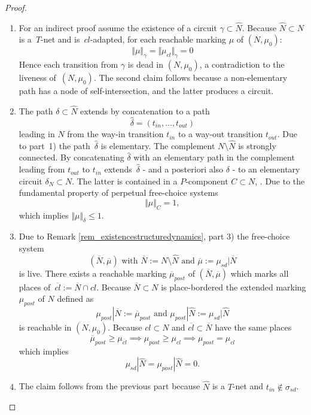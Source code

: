 \documentclass{fundam}
\newcommand{\qed}{}
\begin{document}
\begin{proof}

\vspace*{-6mm}
\begin{enumerate}
\item For an indirect proof assume the existence of a circuit $\gamma \subset \hat{N}$. Because $\hat{N} \subset N$ is \mbox{a $T$-net} and \mbox{is $cl$-adapted}, for each reachable marking $\mu$ of $(N,\mu_0)$:
$$\Vert \mu \Vert_\gamma=\Vert \mu_{cl} \Vert_\gamma=0$$
Hence each transition from $\gamma$ is dead in $(N,\mu_0)$, a contradiction to the liveness \mbox{of $(N,\mu_0)$}. The second claim follows because a non-elementary path has a node of self-intersection, and the latter produces a circuit.

\item The path $\delta \subset \hat{N}$ extends by concatenation to a path
$$\hat{\delta} =(t_{in},...,t_{out})$$
leading in $\hat{N}$ from the way-in transition $t_{in}$ to a way-out transition $t_{out}$. Due to \mbox{part 1)} the path~$\hat{\delta}$ is elementary. The complement $N \setminus \hat{N}$ is strongly connected. By concatenating $\hat{\delta}$ with an elementary path in the complement leading from $t_{out}$ to $t_{in}$ \mbox{extends $\hat{\delta}$} - and a posteriori also $\delta$ - to an elementary circuit $\delta_N \subset N$. The latter is contained in a $P$-component $C \subset N$, \cite[Analogue of Cor. 5.6]{TV1984}. Due to the fundamental property of perpetual free-choice systems
$$\Vert \mu \Vert_C=1,$$
which implies $\Vert \mu \Vert _\delta \leq 1$.

\item Due to Remark \ref{rem_existencestructuredynamics}, part 3) the free-choice system
$$(\overline{N},\overline{\mu}) \text{ with } \overline{N}:=N\setminus \hat{N} \text{ and } \overline{\mu}:=\mu_{sd}|\overline{N}$$
is live. There exists a reachable marking $\overline{\mu}_{post}$ of $(\overline{N},\overline{\mu})$ which marks all places \mbox{of $\overline{cl}:=\overline{N}\cap cl$}. Because $\overline{N} \subset N$ is place-bordered the extended marking $\mu_{post}$ of $N$ defined as
$$\mu_{post}|\overline{N}:=\overline{\mu}_{post} \text{ and } \mu_{post}|\hat{N} :=\mu_{sd}|\hat{N}$$
is reachable in $(N,\mu_0)$. Because $cl \subset N$ and $\overline{cl} \subset \overline{N}$ have the same places
$$\overline{\mu}_{post} \geq \mu_{\overline{cl}} \implies \mu_{post} \geq \mu_{cl} \implies \mu_{post} = \mu_{cl}$$
which implies
$$\mu_{sd}|\hat{N}= \mu_{post}|\hat{N}=0.$$
\item The claim follows from the previous part because $\hat{N}$ is a $T$-net and $t_{in} \notin \sigma_{sd}$.\qed
\end{enumerate}

\vspace*{-7mm}
\end{proof}
\end{document}
